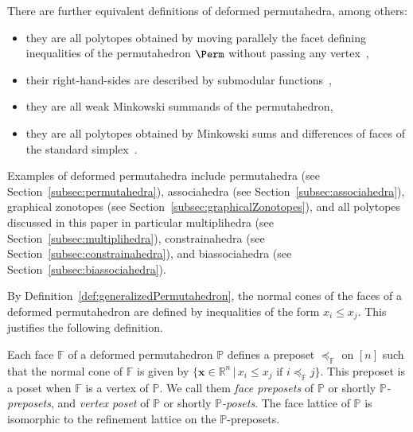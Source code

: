 \documentclass[AHL,Unicode,longabstracts,published]{cedram}
\newcommand{\R}{\mathbb{R}}
\renewcommand{\b}[1]{\boldsymbol{#1}}
\newcommand{\polytope}[1]{\mathds{#1}}
\begin{document}
\begin{rema}\label{rem:alternativeDefinitionsDeformedPermutahedra}
There are further equivalent definitions of deformed permutahedra, among others:
\begin{itemize}
\item they are all polytopes obtained by moving parallely the facet defining inequalities of the permutahedron $\Perm$ without passing any vertex~\cite{Postnikov,PostnikovReinerWilliams},
\item their right-hand-sides are described by submodular functions~\cite{Edmonds,Postnikov,PostnikovReinerWilliams},
\item they are all weak Minkowski summands of the permutahedron\linebreak \cite{Meyer,McMullen-typeCone},
\item they are all polytopes obtained by Minkowski sums and differences of faces of the standard simplex~\cite{ArdilaBenedettiDoker}.
\end{itemize}
\end{rema}

\begin{exam}
Examples of deformed permutahedra include permutahedra (see Section~\ref{subsec:permutahedra}), associahedra (see Section~\ref{subsec:associahedra}), graphical zonotopes (see Section~\ref{subsec:graphicalZonotopes}), and all polytopes discussed in this paper in particular multiplihedra (see Section~\ref{subsec:multiplihedra}), constrainahedra (see Section~\ref{subsec:constrainahedra}), and biassociahedra (see Section~\ref{subsec:biassociahedra}).
\end{exam}

By Definition~\ref{def:generalizedPermutahedron}, the normal cones of the faces of a deformed permutahedron are defined by inequalities of the form $x_i \le x_j$. This justifies the following definition.

\begin{defi}\label{def:facePreposet}
Each face $\polytope{F}$ of a deformed permutahedron $\polytope{P}$ defines a preposet $\preccurlyeq_\polytope{F}$ on $[n]$ such that the normal cone of $\polytope{F}$ is given by ${\{\b{x} \!\in\! \R^n\,|\,x_i \!\le\! x_j \text{ if } i \!\preccurlyeq_\polytope{F}\! j\}}$. This preposet is a poset when $\polytope{F}$ is a vertex of $\polytope{P}$. We call them
\emph{face preposets} of $\polytope{P}$ or shortly
\emph{$\polytope{P}$-preposets}, and
\emph{vertex poset} of $\polytope{P}$ or shortly
\emph{$\polytope{P}$-posets}. The face lattice of $\polytope{P}$ is isomorphic to the refinement lattice on the $\polytope{P}$-preposets.
\end{defi}
\end{document}
